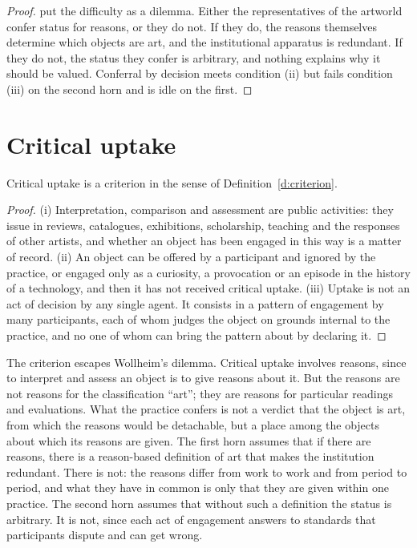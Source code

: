 \documentclass{situationist-preprint}
\begin{document}
\begin{proof}
\citet{Wollheim1980} put the difficulty as a dilemma. Either the representatives of the artworld confer status for reasons, or they do not. If they do, the reasons themselves determine which objects are art, and the institutional apparatus is redundant. If they do not, the status they confer is arbitrary, and nothing explains why it should be valued. Conferral by decision meets condition (ii) but fails condition (iii) on the second horn and is idle on the first.
\end{proof}

\section{Critical uptake}

\begin{proposition}\label{p:uptake}
Critical uptake is a criterion in the sense of Definition~\ref{d:criterion}.
\end{proposition}

\begin{proof}
(i) Interpretation, comparison and assessment are public activities: they issue in reviews, catalogues, exhibitions, scholarship, teaching and the responses of other artists, and whether an object has been engaged in this way is a matter of record. (ii) An object can be offered by a participant and ignored by the practice, or engaged only as a curiosity, a provocation or an episode in the history of a technology, and then it has not received critical uptake. (iii) Uptake is not an act of decision by any single agent. It consists in a pattern of engagement by many participants, each of whom judges the object on grounds internal to the practice, and no one of whom can bring the pattern about by declaring it.
\end{proof}

The criterion escapes Wollheim's dilemma. Critical uptake involves reasons, since to interpret and assess an object is to give reasons about it. But the reasons are not reasons for the classification \enquote{art}; they are reasons for particular readings and evaluations. What the practice confers is not a verdict that the object is art, from which the reasons would be detachable, but a place among the objects about which its reasons are given. The first horn assumes that if there are reasons, there is a reason-based definition of art that makes the institution redundant. There is not: the reasons differ from work to work and from period to period, and what they have in common is only that they are given within one practice. The second horn assumes that without such a definition the status is arbitrary. It is not, since each act of engagement answers to standards that participants dispute and can get wrong.
\end{document}
